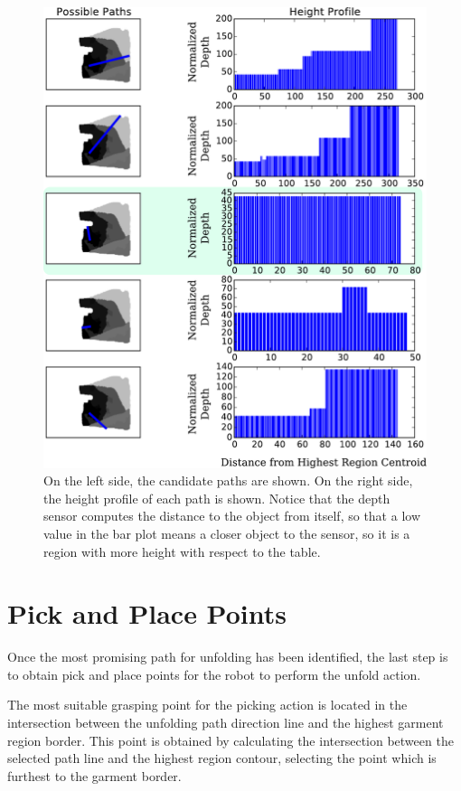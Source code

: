 \begin{figure}[thpb]
    \centering
    \includegraphics[width=\textwidth]{figures/candidate_paths.pdf}
    \caption{On the left side, the candidate paths are shown. On the right side, the height profile of each path is shown. Notice that the depth sensor computes the distance to the object from itself, so that a low value in the bar plot means a closer object to the sensor, so it is a region with more height with respect to the table.}
    \label{fig:paths_with_bumpiness}
\end{figure}

\section{Pick and Place Points}
\label{pick_and_place}
Once the most promising path for unfolding has been identified, the last step is to obtain pick and place points for the robot to perform the unfold action.

The most suitable grasping point for the picking action is located in the  intersection between the unfolding path direction line and the highest garment region border. This point is obtained by calculating the intersection between the selected path line and the highest region contour, selecting the point which is furthest to the garment border.

